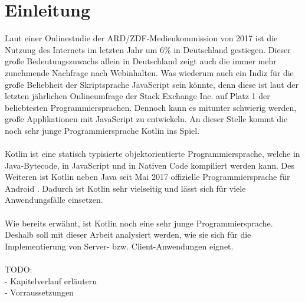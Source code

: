 
\chapter{Einleitung}
Laut einer Onlinestudie der ARD/ZDF-Medienkommission von 2017 \cite{onlineStudy2017,resultsOnlineStudy2017} ist die Nutzung des Internets im letzten Jahr um 6\% in Deutschland gestiegen. Dieser große Bedeutungszuwachs allein in Deutschland zeigt auch die immer mehr zunehmende Nachfrage nach Webinhalten. Was wiederum auch ein Indiz für die große Beliebheit der Skriptsprache JavaScript sein könnte, denn diese ist laut der letzten jährlichen Onlineumfrage der Stack Exchange Inc. \cite{developerSurvey2017} auf Platz 1 der beliebtesten Programmiersprachen. Dennoch kann es mitunter schwierig werden, große Applikationen mit JavaScript zu entwickeln. An dieser Stelle kommt die noch sehr junge Programmiersprache Kotlin ins Spiel.\\
\\
Kotlin ist eine statisch typisierte objektorientierte Programmiersprache, welche in Java-Bytecode, in JavaScript und in Nativen Code kompiliert werden kann. Des Weiteren ist Kotlin neben Java seit Mai 2017 offizielle Programmiersprache für Android \cite{kotlinAndroidOfficial}. Dadurch ist Kotlin sehr vielseitig und lässt sich für viele Anwendungsfälle einsetzen. \\
\\
Wie bereits erwähnt, ist Kotlin noch eine sehr junge Programmiersprache. Deshalb soll mit dieser Arbeit analysiert werden, wie sie sich für die Implementierung von Server- bzw. Client-Anwendungen eignet.\\
\\
TODO:\\
- Kapitelverlauf erläutern\\
- Vorraussetzungen\\